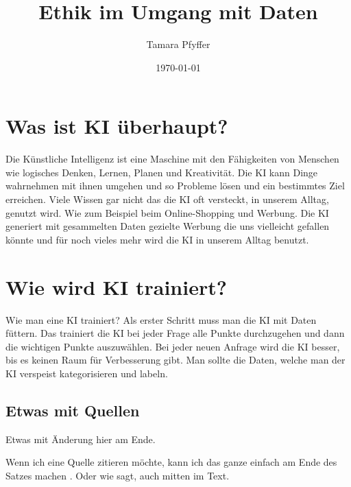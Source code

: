 \documentclass{report}
\title{Ethik im Umgang mit Daten}
\author{Tamara Pfyffer}
\date{\today}
\begin{document}
\maketitle


\tableofcontents

\chapter{Was ist KI überhaupt?}
Die Künstliche Intelligenz ist eine Maschine mit den Fähigkeiten von Menschen wie logisches Denken, Lernen, Planen und Kreativität. Die KI kann
Dinge wahrnehmen mit ihnen umgehen und so Probleme lösen und ein bestimmtes Ziel erreichen. Viele Wissen gar nicht das die KI oft versteckt,
in unserem Alltag, genutzt wird. Wie zum Beispiel beim Online-Shopping
und Werbung. Die KI generiert mit gesammelten Daten gezielte Werbung
die uns vielleicht gefallen könnte und für noch vieles mehr wird die KI in
unserem Alltag benutzt.

\chapter{Wie wird KI trainiert?}
Wie man eine KI trainiert? Als erster Schritt muss man die KI mit Daten
füttern. Das trainiert die KI bei jeder Frage alle Punkte durchzugehen und
dann die wichtigen Punkte auszuwählen. Bei jeder neuen Anfrage wird die
KI besser, bis es keinen Raum für Verbesserung gibt. Man sollte die Daten,
welche man der KI verspeist kategorisieren und labeln.





\section{Etwas mit Quellen}

Etwas mit Änderung hier am Ende.

Wenn ich eine Quelle zitieren möchte, kann ich das ganze einfach am Ende des Satzes machen \citep{example}. Oder wie \citet{example} sagt, auch mitten im Text.

\printbibliography
\end{document}
